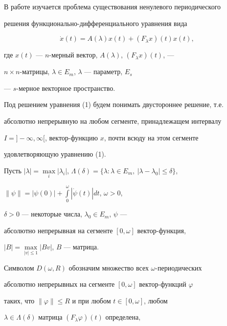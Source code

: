 \label{begin} 


 


В работе изучается проблема существования ненулевого периодического 


решения функ\-ци\-о\-наль\-но-дифференциального уравнения вида 


\begin{equation} 


\Dot x(t)=A(\lambda)x(t)+(F_\lambda x)(t)x(t), 


\end{equation} 


где $x(t)$ --- $n$-мерный вектор, $A(\lambda)$, $(F_\lambda x)(t)$, --- 


$n\times n$-матрицы, $\lambda\in E_m$, $\lambda$ --- параметр, $E_s$ 


--- $s$-мерное векторное пространство. 


 


Под решением уравнения (1) будем понимать двустороннее решение, т.е. 


абсолютно непрерывную на любом сегменте, принадлежащем интервалу 


$I=]-\infty,\infty[$, вектор-функцию $x$, почти всюду на этом сегменте 


удовлетворяющую уравнению (1). 


 


Пусть $|\lambda|=\max\limits_i|\lambda_i|$, $\Lambda(\delta)=\{\lambda: 


\lambda\in E_m,\ |\lambda-\lambda_0|\le\delta\}$, 


$\|\psi\|=|\psi(0)|+\int\limits^\omega_0|\Dot\psi(t)|dt$, $\omega>0$, 


$\delta>0$ --- некоторые числа, $\lambda_0\in E_m$, $\psi$ --- 


абсолютно непрерывная на сегменте $[0,\omega]$ вектор-функция, 


$|B|=\max\limits_{|v|\le 1}|B v|$, $B$ --- матрица. 


 


Символом $D(\omega,R)$ обозначим множество всех $\omega$-периодических 


абсолютно непрерывных на сегменте $[0,\omega]$ вектор-функций $\varphi$ 


таких, что $\|\varphi\|\le R$ и при любом $t\in[0,\omega]$, любом 


$\lambda\in\Lambda(\delta)$ матрица $(F_\lambda\varphi)(t)$ определена, 


